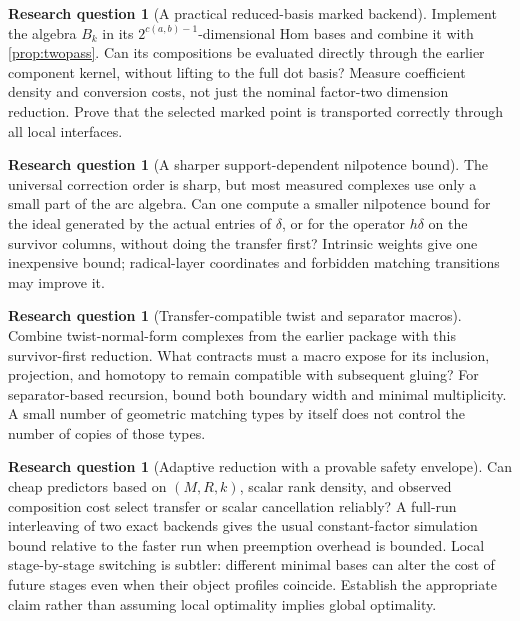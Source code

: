 \documentclass[11pt,letterpaper]{article}
\theoremstyle{definition}
\newtheorem{question}[theorem]{Research question}
\theoremstyle{remark}
\begin{document}
\begin{question}[A practical reduced-basis marked backend]
Implement the algebra $B_k$ in its $2^{c(a,b)-1}$-dimensional Hom bases and
combine it with \cref{prop:twopass}. Can its compositions be evaluated directly
through the earlier component kernel, without lifting to the full dot basis?
Measure coefficient density and conversion costs, not just the nominal
factor-two dimension reduction. Prove that the selected marked point is
transported correctly through all local interfaces.
\end{question}

\begin{question}[A sharper support-dependent nilpotence bound]
The universal correction order is sharp, but most measured complexes use only
a small part of the arc algebra. Can one compute a smaller nilpotence bound for
the ideal generated by the actual entries of $\delta$, or for the operator
$h\delta$ on the survivor columns, without doing the transfer first? Intrinsic
weights give one inexpensive bound; radical-layer coordinates and forbidden
matching transitions may improve it.
\end{question}

\begin{question}[Transfer-compatible twist and separator macros]
Combine twist-normal-form complexes from the earlier package with this
survivor-first reduction. What contracts must a macro expose for its inclusion,
projection, and homotopy to remain compatible with subsequent gluing?
For separator-based recursion, bound both boundary width and minimal
multiplicity. A small number of geometric matching types by itself does not
control the number of copies of those types.
\end{question}

\begin{question}[Adaptive reduction with a provable safety envelope]
Can cheap predictors based on $(M,R,k)$, scalar rank density, and observed
composition cost select transfer or scalar cancellation reliably? A full-run
interleaving of two exact backends gives the usual constant-factor simulation
bound relative to the faster run when preemption overhead is bounded. Local
stage-by-stage switching is subtler: different minimal bases can alter the
cost of future stages even when their object profiles coincide. Establish the
appropriate claim rather than assuming local optimality implies global
optimality.
\end{question}
\end{document}
